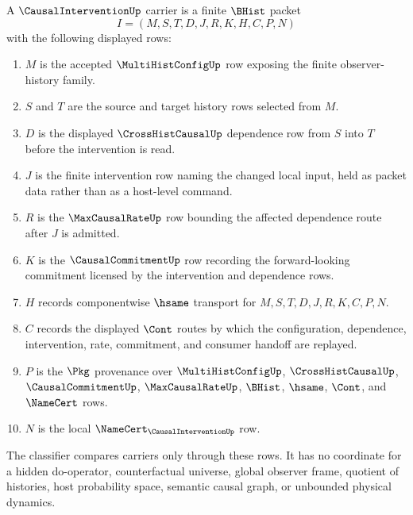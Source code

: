 \begin{definition}
\label{def:causal-intervention-carrier}
A $\CausalInterventionUp$ carrier is a finite $\BHist$ packet
$$
I=(M,S,T,D,J,R,K,H,C,P,N)
$$
with the following displayed rows:
\begin{enumerate}
\item $M$ is the accepted $\MultiHistConfigUp$ row exposing the finite observer-history family.
\item $S$ and $T$ are the source and target history rows selected from $M$.
\item $D$ is the displayed $\CrossHistCausalUp$ dependence row from $S$ into $T$ before the intervention is read.
\item $J$ is the finite intervention row naming the changed local input, held as packet data rather than as a host-level command.
\item $R$ is the $\MaxCausalRateUp$ row bounding the affected dependence route after $J$ is admitted.
\item $K$ is the $\CausalCommitmentUp$ row recording the forward-looking commitment licensed by the intervention and dependence rows.
\item $H$ records componentwise $\hsame$ transport for $M,S,T,D,J,R,K,C,P,N$.
\item $C$ records the displayed $\Cont$ routes by which the configuration, dependence, intervention, rate, commitment, and consumer handoff are replayed.
\item $P$ is the $\Pkg$ provenance over $\MultiHistConfigUp$, $\CrossHistCausalUp$, $\CausalCommitmentUp$, $\MaxCausalRateUp$, $\BHist$, $\hsame$, $\Cont$, and $\NameCert$ rows.
\item $N$ is the local $\NameCert_{\CausalInterventionUp}$ row.
\end{enumerate}
The classifier compares carriers only through these rows. It has no coordinate for a hidden do-operator, counterfactual universe, global observer frame, quotient of histories, host probability space, semantic causal graph, or unbounded physical dynamics.
\end{definition}


